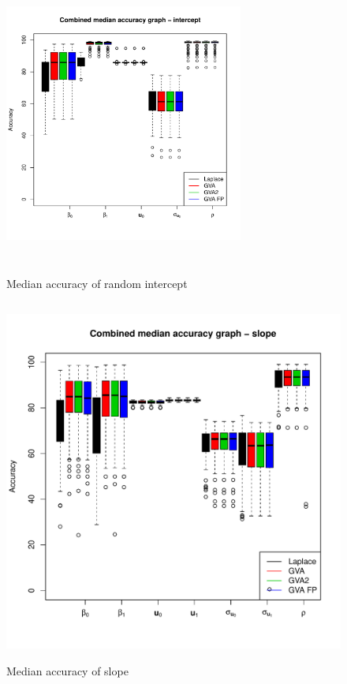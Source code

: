 \documentclass{amsart}[12pt]
\begin{document}
			\begin{figure}
				\begin{center}
					\includegraphics[width=0.7\textwidth, height=100mm]{code/results/median_accuracy_combined_intercept.pdf}
					\caption{Median accuracy of random intercept}
					\label{fig:median_accuracy_intercept}
				\end{center}
			\end{figure}
					
			\begin{figure}
				\caption{Median accuracy of slope}
				\label{fig:median_accuracy_slope}
				\includegraphics[width=120mm, height=120mm]{code/results/median_accuracy_combined_slope.pdf}
			\end{figure}
					
\end{document}
